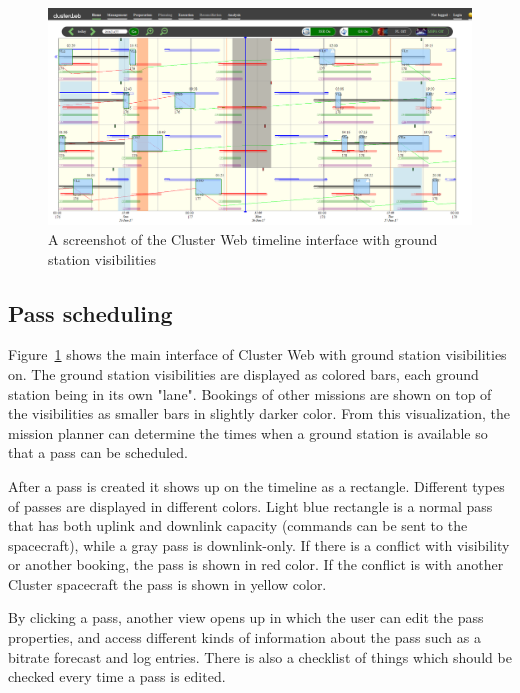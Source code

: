 \begin{figure}[ht]
  \begin{center}
    \includegraphics*[width=1\textwidth]{clusterweb_visibilities}
  \end{center}
  \caption{A screenshot of the Cluster Web timeline interface with ground station visibilities}
  \label{fig:clusterweb_visibilities}
\end{figure}

\subsection{Pass scheduling}
Figure~\ref{fig:clusterweb_visibilities} shows the main interface of Cluster Web with ground station visibilities on. The ground station visibilities are displayed as colored bars, each ground station being in its own "lane". Bookings of other missions are shown on top of the visibilities as smaller bars in slightly darker color. From this visualization, the mission planner can determine the times when a ground station is available so that a pass can be scheduled. 

After a pass is created it shows up on the timeline as a rectangle. Different types of passes are displayed in different colors. Light blue rectangle is a normal pass that has both uplink and downlink capacity (commands can be sent to the spacecraft), while a gray pass is downlink-only. If there is a conflict with visibility or another booking, the pass is shown in red color. If the conflict is with another Cluster spacecraft the pass is shown in yellow color.

By clicking a pass, another view opens up in which the user can edit the pass properties, and access different kinds of information about the pass such as a bitrate forecast and log entries. There is also a checklist of things which should be checked every time a pass is edited.

